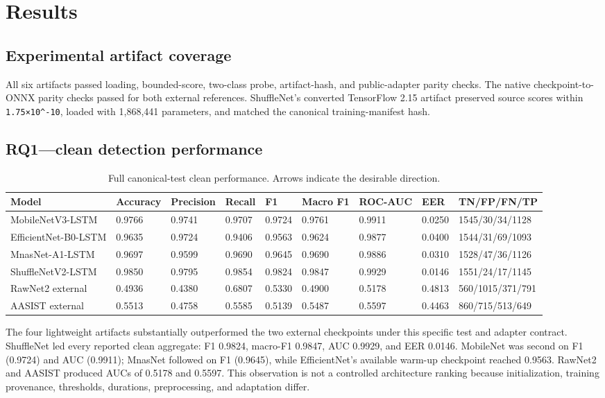\documentclass[10pt,journal]{IEEEtran}
\begin{document}
\section{Results}
\subsection{Experimental artifact coverage}
All six artifacts passed loading, bounded-score, two-class probe, artifact-hash, and public-adapter parity checks. The native checkpoint-to-ONNX parity checks passed for both external references. ShuffleNet's converted TensorFlow 2.15 artifact preserved source scores within \texttt{1.75×10^-10}, loaded with 1,868,441 parameters, and matched the canonical training-manifest hash.

\subsection{RQ1—clean detection performance}
\begin{table}[htbp]
\centering
\small
\caption{Full canonical-test clean performance. Arrows indicate the desirable direction.}
\label{tab:6}
\begin{tabularx}{\textwidth}{lXXXXXXXX}
\toprule
Model & Accuracy & Precision & Recall & F1 & Macro F1 & ROC-AUC & EER & TN/FP/FN/TP \\
\midrule
MobileNetV3-LSTM & 0.9766 & 0.9741 & 0.9707 & 0.9724 & 0.9761 & 0.9911 & 0.0250 & 1545/30/34/1128 \\
EfficientNet-B0-LSTM & 0.9635 & 0.9724 & 0.9406 & 0.9563 & 0.9624 & 0.9877 & 0.0400 & 1544/31/69/1093 \\
MnasNet-A1-LSTM & 0.9697 & 0.9599 & 0.9690 & 0.9645 & 0.9690 & 0.9886 & 0.0310 & 1528/47/36/1126 \\
ShuffleNetV2-LSTM & 0.9850 & 0.9795 & 0.9854 & 0.9824 & 0.9847 & 0.9929 & 0.0146 & 1551/24/17/1145 \\
RawNet2 external & 0.4936 & 0.4380 & 0.6807 & 0.5330 & 0.4900 & 0.5178 & 0.4813 & 560/1015/371/791 \\
AASIST external & 0.5513 & 0.4758 & 0.5585 & 0.5139 & 0.5487 & 0.5597 & 0.4463 & 860/715/513/649 \\
\bottomrule
\end{tabularx}
\end{table}
The four lightweight artifacts substantially outperformed the two external checkpoints under this specific test and adapter contract. ShuffleNet led every reported clean aggregate: F1 0.9824, macro-F1 0.9847, AUC 0.9929, and EER 0.0146. MobileNet was second on F1 (0.9724) and AUC (0.9911); MnasNet followed on F1 (0.9645), while EfficientNet's available warm-up checkpoint reached 0.9563. RawNet2 and AASIST produced AUCs of 0.5178 and 0.5597. This observation is not a controlled architecture ranking because initialization, training provenance, thresholds, durations, preprocessing, and adaptation differ.
\end{document}
